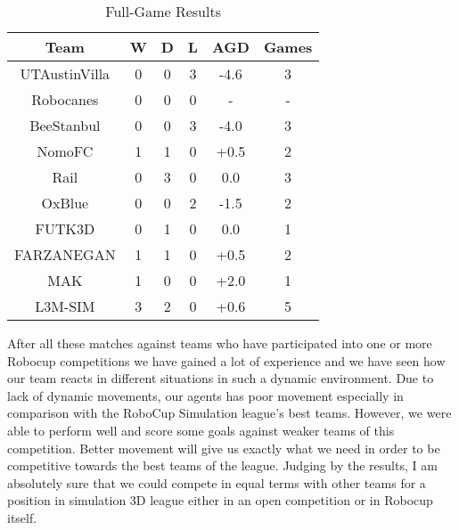 \begin{table}
\begin{center}
    \begin{tabular}{ | c | c | c | c | c | c | }
    \hline
    \textbf{Team} 	& \textbf{W} & \textbf{D} & \textbf{L} & \textbf{AGD}\footnotemark 	& \textbf{Games}   \\ \hline
    UTAustinVilla 	& 0		& 0		& 3		& -4.6 		& 3 			\\ \hline	
    Robocanes 		& 0		& 0		& 0		& -			& - 			\\ \hline
    BeeStanbul		& 0		& 0		& 3		& -4.0		& 3				\\ \hline
    NomoFC 			& 1		& 1		& 0		& +0.5 		& 2 			\\ \hline
    Rail 			& 0		& 3		& 0		& 0.0 		& 3 			\\ \hline
    OxBlue 			& 0		& 0		& 2		& -1.5 		& 2 			\\ \hline
    FUTK3D 			& 0		& 1		& 0		& 0.0 		& 1 			\\ \hline
    FARZANEGAN 		& 1		& 1		& 0		& +0.5 		& 2 			\\ \hline
    MAK 				& 1		& 0		& 0		& +2.0 		& 1 			\\ \hline
    L3M-SIM			& 3		& 2 		& 0		& +0.6 		& 5 			\\     
    \hline
    \end{tabular}
\end{center}
\label{GameResults}
\caption{Full-Game Results}
\end{table}




After all these matches against teams who have participated into one or more Robocup competitions we have gained a lot of experience and we have seen how our team reacts in different situations in such a dynamic environment. Due to lack of dynamic movements, our agents has poor movement especially in comparison with the RoboCup Simulation league's best teams. However, we were able to perform well and score some goals against weaker teams of this competition. Better movement will give us exactly what we need in order to be competitive towards the best teams of the league. Judging by the results, I am absolutely sure that we could compete in equal terms with other teams for a position in simulation 3D league either in an open competition or in Robocup itself.

